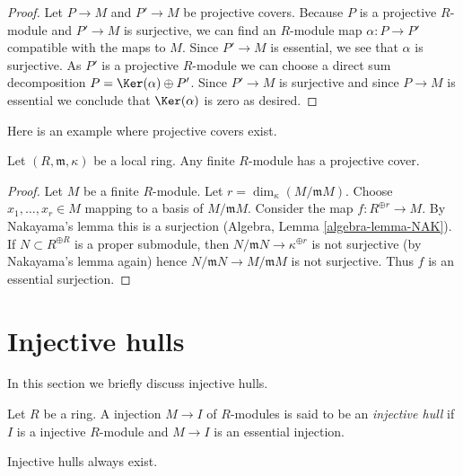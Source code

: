 \begin{proof}
Let $P \to M$ and $P' \to M$ be projective covers. Because $P$ is a
projective $R$-module and $P' \to M$ is surjective, we can find an
$R$-module map $\alpha : P \to P'$ compatible with the maps to $M$.
Since $P' \to M$ is essential, we see that $\alpha$ is surjective.
As $P'$ is a projective $R$-module we can choose a direct sum decomposition
$P = \Ker(\alpha) \oplus P'$. Since $P' \to M$ is surjective
and since $P \to M$ is essential we conclude that $\Ker(\alpha)$
is zero as desired.
\end{proof}

\noindent
Here is an example where projective covers exist.

\begin{lemma}
\label{lemma-projective-covers-local}
Let $(R, \mathfrak m, \kappa)$ be a local ring. Any finite $R$-module has
a projective cover.
\end{lemma}

\begin{proof}
Let $M$ be a finite $R$-module. Let $r = \dim_\kappa(M/\mathfrak m M)$.
Choose $x_1, \ldots, x_r \in M$ mapping to a basis of $M/\mathfrak m M$.
Consider the map $f : R^{\oplus r} \to M$. By Nakayama's lemma this is
a surjection (Algebra, Lemma \ref{algebra-lemma-NAK}). If
$N \subset R^{\oplus R}$ is a proper submodule, then
$N/\mathfrak m N \to \kappa^{\oplus r}$ is not surjective (by
Nakayama's lemma again) hence $N/\mathfrak m N \to M/\mathfrak m M$
is not surjective. Thus $f$ is an essential surjection.
\end{proof}







\section{Injective hulls}
\label{section-injective-hull}

\noindent
In this section we briefly discuss injective hulls.

\begin{definition}
\label{definition-injective-hull}
Let $R$ be a ring. A injection $M \to I$ of $R$-modules is said
to be an {\it injective hull} if $I$ is a injective $R$-module and
$M \to I$ is an essential injection.
\end{definition}

\noindent
Injective hulls always exist.

